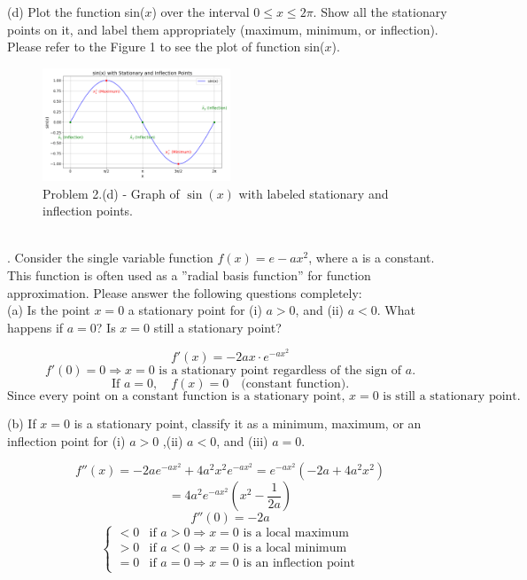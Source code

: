 \documentclass{article} %
\begin{document}
{    \noindent (d) Plot the function sin($x$) over the interval $ 0 \leq x \leq 2\pi $. Show all the stationary points on it, and
    label them appropriately (maximum, minimum, or inflection). \\
    
    Please refer to the Figure 1 to see the plot of function sin($x$).
    \begin{figure}[h!]
    \centering
    \includegraphics[width=0.5\textwidth]{generated_image.png}
    \caption{Problem 2.(d) - Graph of $\sin(x)$ with labeled stationary and inflection points.}
    \label{fig1}
    \end{figure} \\

    . Consider the single variable function $ f(x) = e - ax^2 $, where a is a constant. This function is often used as
    a ”radial basis function” for function approximation. Please answer the following questions completely: \\

    \noindent (a) Is the point $ x = 0 $ a stationary point for (i) $ a > 0 $, and (ii) $ a < 0 $. What happens if $ a = 0 $? Is
    $ x = 0 $ still a stationary point?

    \[
        f'(x) = -2ax \cdot e^{-ax^2}
        \]
        \[
        f'(0) = 0 \Rightarrow x = 0 \text{ is a stationary point regardless of the sign of } a.
        \]
        \[
        \text{If } a = 0, \quad f(x) = 0 \quad \text{(constant function).}
        \]
        \[
        \text{Since every point on a constant function is a stationary point, } x = 0 \text{ is still a stationary point.}
    \]

    \noindent (b) If $ x = 0 $ is a stationary point, classify it as a minimum, maximum, or an inflection point for (i)
    $ a > 0 $ ,(ii) $ a < 0 $, and (iii) $ a = 0 $.

    \[
        f''(x) = -2a e^{-ax^2} + 4a^2 x^2 e^{-ax^2} = e^{-ax^2} (-2a + 4a^2 x^2)
        \]
        \[
        = 4a^2 e^{-ax^2} \left(x^2 - \frac{1}{2a} \right)
        \]
        \[
        f''(0) = -2a
        \]
        \[
        \begin{cases}
        < 0 & \text{if } a > 0 \Rightarrow x = 0 \text{ is a local maximum} \\
        > 0 & \text{if } a < 0 \Rightarrow x = 0 \text{ is a local minimum} \\
        = 0 & \text{if } a = 0 \Rightarrow x = 0 \text{ is an inflection point}
        \end{cases}
    \]

}
\end{document}

